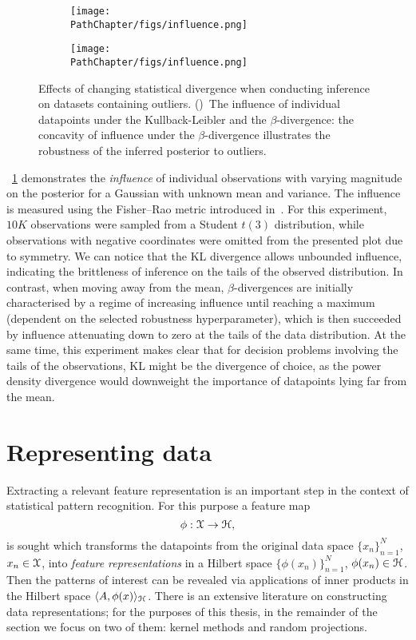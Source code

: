 \begin{figure*}[!t]
	\begin{subfigure}[t]{0.49\textwidth} 
	\centering
	\texttt{[image: \\PathChapter/figs/influence.png]}
	\caption{\centering {}}
	\label{fig:influence}
	\end{subfigure}	
	\begin{subfigure}[t]{0.49\textwidth} 
	\centering
	\texttt{[image: \\PathChapter/figs/influence.png]}
	\caption{\centering {}}
	\label{fig:influence-b}
	\end{subfigure}	
	\caption{Effects of changing statistical divergence when conducting inference on datasets containing outliers. ()~The influence of individual datapoints under the Kullback-Leibler and the $\beta$-divergence: the concavity of influence under the $\beta$-divergence illustrates the robustness of the inferred posterior to outliers.}
	\label{fig:robust-inference}
\end{figure*}

~\cref{fig:influence} demonstrates the \emph{influence} of individual observations with varying magnitude on the posterior for a Gaussian with unknown mean and variance. The influence is measured using the Fisher--Rao metric introduced in~\citep{kurtek15}. For this experiment, $10K$ observations were sampled from a Student $t(3)$ distribution, while observations with negative coordinates were omitted from the presented plot due to symmetry. We can notice that the KL divergence allows unbounded influence, indicating the brittleness of inference on the tails of the observed distribution. In contrast, when moving away from the mean, $\beta$-divergences are initially characterised by a regime of increasing influence until reaching a maximum (dependent on the selected robustness hyperparameter), which is then succeeded by influence attenuating down to zero at the tails of the data distribution. At the same time, this experiment makes clear that for decision problems involving the tails of the observations, KL might be the divergence of choice, as the power density divergence would downweight the importance of datapoints lying far from the mean.   


\section{Representing data}
\label{sec:b-representing-data}
Extracting a relevant feature representation is an important step in the context of statistical pattern recognition. For this purpose a feature map 
\[
\phi: \mathcal{X} \rightarrow \mathcal{H},
\]
is sought which transforms the datapoints from the original data space $\{x_n\}_{n=1}^{N}$, $x_n \in \mathcal{X}$, into \emph{feature representations} in a Hilbert space $\{\phi(x_n)\}_{n=1}^{N}$, $\phi(x_n) \in \mathcal{H}$. Then the patterns of interest can be revealed via applications of inner products in the Hilbert space $\langle A, \phi(x) \rangle_{\mathcal{H}}$. There is an extensive literature on constructing data representations; for the purposes of this thesis, in the remainder of the section we focus on two of them: kernel methods and random projections.


